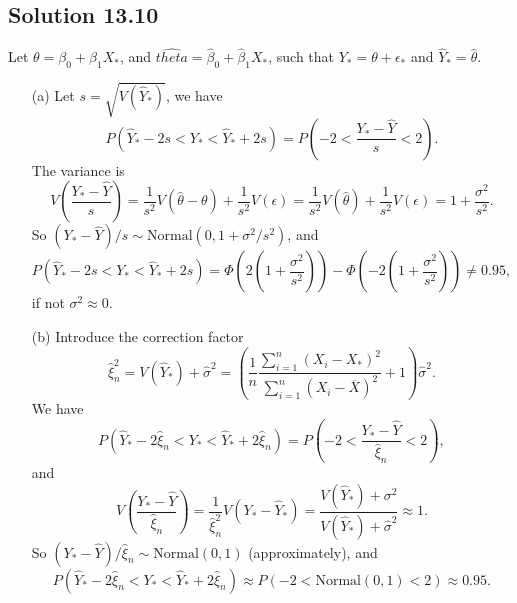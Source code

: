 \subsection*{Solution 13.10}

Let $\theta = \beta_0 + \beta_1 X_*$, and $\hat{theta} = \hat{\beta}_0 + \hat{\beta}_1 X_*$, such that $Y_* = \theta + \epsilon_*$ and $\hat{Y}_* = \hat{\theta}$.

\begin{itemize}
    \item[(a)] Let $s = \sqrt{V(\hat{Y}_*)}$, we have
        \begin{equation*}
            P\left(\hat{Y}_* - 2s < Y_* < \hat{Y}_* + 2s\right)
                = P\left(-2 < \frac{Y_* - \hat{Y}}{s} < 2\right).
        \end{equation*}
        The variance is
        \begin{equation*}
            V\left(\frac{Y_* - \hat{Y}}{s}\right)
                = \frac{1}{s^2}V\left(\hat{\theta} - \theta\right) + \frac{1}{s^2}V(\epsilon)
                = \frac{1}{s^2}V(\hat{\theta}) + \frac{1}{s^2}V(\epsilon)
                = 1 + \frac{\sigma^2}{s^2}.
        \end{equation*}
        So $(Y_* - \hat{Y})/s \sim \mathrm{Normal}(0, 1 + \sigma^2/s^2)$, and
        \begin{equation*}
            P\left(\hat{Y}_* - 2s < Y_* < \hat{Y}_* + 2s\right)
                = \Phi\left(2\left(1 + \frac{\sigma^2}{s^2}\right)\right) - \Phi\left(-2\left(1 + \frac{\sigma^2}{s^2}\right)\right)
                \neq 0.95,
        \end{equation*}
        if not $\sigma^2 \approx 0$.
    \item[(b)] Introduce the correction factor
        \begin{equation*}
            \hat{\xi}_n^2 = V(\hat{Y}_*) + \hat{\sigma}^2
                = \left(\frac{1}{n} \frac{\sum_{i = 1}^n (X_i - X_*)^2}{\sum_{i = 1}^n (X_i - \overline{X})^2} + 1\right) \hat{\sigma}^2.
        \end{equation*}
        We have
        \begin{equation*}
            P\left(\hat{Y}_* - 2\hat{\xi}_n < Y_* < \hat{Y}_* + 2\hat{\xi}_n\right)
                = P\left(-2 < \frac{Y_* - \hat{Y}}{\hat{\xi}_n} < 2\right),
        \end{equation*}
        and
        \begin{equation*}
            V\left(\frac{Y_* - \hat{Y}}{\hat{\xi}_n}\right)
                = \frac{1}{\hat{\xi}_n^2} V(Y_* - \hat{Y}_*)
                = \frac{V(\hat{Y}_*) + \sigma^2}{V(\hat{Y}_*) + \hat{\sigma}^2}
                \approx 1.
        \end{equation*}
        So $(Y_* - \hat{Y})/\hat{\xi}_n \sim \mathrm{Normal}(0, 1)$ (approximately), and
        \begin{equation*}
            P\left(\hat{Y}_* - 2\hat{\xi}_n < Y_* < \hat{Y}_* + 2\hat{\xi}_n\right)
                \approx P(-2 < \mathrm{Normal}(0, 1) < 2)
                \approx 0.95.
        \end{equation*}
\end{itemize}
